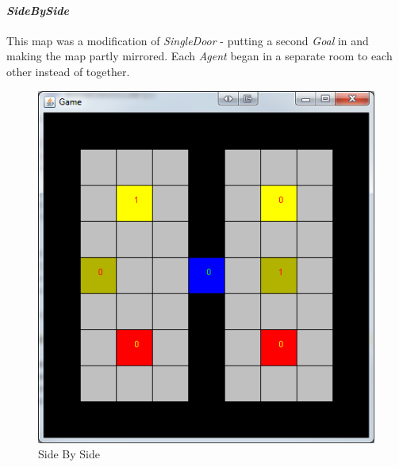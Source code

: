 \documentclass{IEEEtran}
\begin{document}
\paragraph{\emph{SideBySide}} This map was a modification of \emph{SingleDoor} - putting a second \emph{Goal} in and making the map partly mirrored. Each \emph{Agent} began in a separate room to each other instead of together.
\begin{figure}[H]
\centering
\includegraphics[scale=0.35]{level4}
\caption{Side By Side}
\label{SideBySide}
\end{figure}
\end{document}
